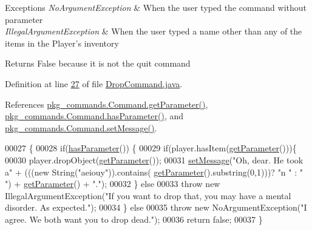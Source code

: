 \begin{DoxyExceptions}{Exceptions}
{\em No\-Argument\-Exception} & When the user typed the command without parameter \\
\hline
{\em Illegal\-Argument\-Exception} & When the user typed a name other than any of the items in the Player's inventory \\
\hline
\end{DoxyExceptions}
\begin{DoxyReturn}{Returns}
False because it is not the quit command 
\end{DoxyReturn}


Definition at line \hyperlink{DropCommand_8java_source_l00027}{27} of file \hyperlink{DropCommand_8java_source}{Drop\-Command.\-java}.



References \hyperlink{Command_8java_source_l00041}{pkg\-\_\-commands.\-Command.\-get\-Parameter()}, \hyperlink{Command_8java_source_l00073}{pkg\-\_\-commands.\-Command.\-has\-Parameter()}, and \hyperlink{Command_8java_source_l00089}{pkg\-\_\-commands.\-Command.\-set\-Message()}.


\begin{DoxyCode}
00027                                                                                               \{
00028         \textcolor{keywordflow}{if}(\hyperlink{classpkg__commands_1_1Command_a02af95ab3f1898a66259ab7c177b6998}{hasParameter}()) \{
00029             \textcolor{keywordflow}{if}(player.hasItem(\hyperlink{classpkg__commands_1_1Command_a41c92d445be73ea9d62320c65efb8434}{getParameter}()))\{
00030                 player.dropObject(\hyperlink{classpkg__commands_1_1Command_a41c92d445be73ea9d62320c65efb8434}{getParameter}());
00031                 \hyperlink{classpkg__commands_1_1Command_ae210ff216fe908b111ba1c988a963d13}{setMessage}(\textcolor{stringliteral}{"Oh, dear. He took a"} + (((\textcolor{keyword}{new} String(\textcolor{stringliteral}{"aeiouy"})).contains(
      \hyperlink{classpkg__commands_1_1Command_a41c92d445be73ea9d62320c65efb8434}{getParameter}().substring(0,1)))? \textcolor{stringliteral}{"n "} : \textcolor{stringliteral}{" "}) + \hyperlink{classpkg__commands_1_1Command_a41c92d445be73ea9d62320c65efb8434}{getParameter}() + \textcolor{stringliteral}{"."});
00032             \} \textcolor{keywordflow}{else}
00033                 \textcolor{keywordflow}{throw} \textcolor{keyword}{new} IllegalArgumentException(\textcolor{stringliteral}{"If you want to drop that, you may have a mental
       disorder. As expected."});
00034         \} \textcolor{keywordflow}{else}
00035             \textcolor{keywordflow}{throw} \textcolor{keyword}{new} NoArgumentException(\textcolor{stringliteral}{"I agree. We both want you to drop dead."});
00036         \textcolor{keywordflow}{return} \textcolor{keyword}{false};
00037     \}
\end{DoxyCode}


